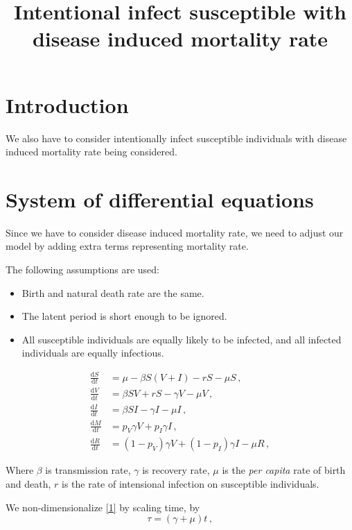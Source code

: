 \documentclass[12pt]{article}
\title{Intentional infect susceptible with disease induced mortality rate}
\newcommand\dbyd[2]{\frac{\mathrm d{#1}}{\mathrm d{#2}}}
\newcommand{\pmV}{p_{V}}
\newcommand{\pmI}{p_{I}}
\begin{document}
\linenumbers
\maketitle

\section{Introduction}

We also have to consider intentionally infect susceptible individuals with disease induced mortality rate being considered.

\section{System of differential equations}

Since we have to consider disease induced mortality rate, we need to adjust our model by adding extra terms representing mortality rate.

The following assumptions are used:

\begin{itemize}
\item Birth and natural death rate are the same.
\item The latent period is short enough to be ignored.
\item All susceptible individuals are equally likely to be infected, and all infected individuals are equally infectious.
\end{itemize}

\begin{subequations}\label{1}
\begin{align}
\dbyd{S}{t}&=\mu- \beta S(V+I)-rS-\mu S \,,\\
\dbyd{V}{t}&=\beta SV+rS-\gamma V -\mu V\,,\\
\dbyd{I}{t}&=\beta SI-\gamma I -\mu I\,,\\
\dbyd{M}{t}&=\pmV\gamma V+\pmI\gamma I\,,\\
\dbyd{R}{t}&=(1-\pmV)\gamma V+(1-\pmI)\gamma I-\mu R\,,
\end{align}
\end{subequations}

Where $\beta$ is transmission rate, $\gamma$ is recovery rate, $\mu$ is the \emph{per capita} rate of birth and death, $r$ is the rate of intensional infection on susceptible individuals.

We non-dimensionalize \autoref{1} by scaling time, by
\begin{equation}
\tau=(\gamma+\mu)t \,,
\end{equation}
\end{document}
